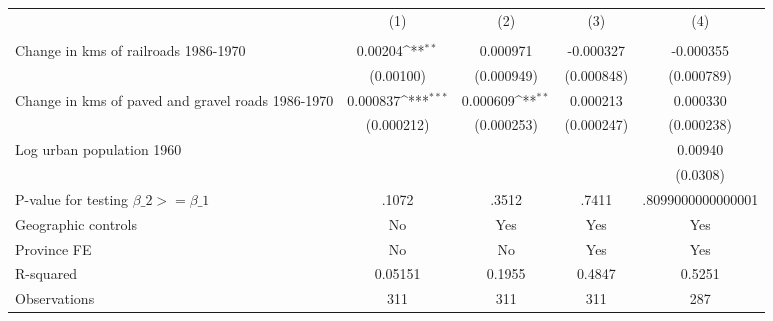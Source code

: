 {
\def\sym#1{\ifmmode^{#1}\else\(^{#1}\)\fi}
\begin{tabular}{l*{4}{c}}
\hline\hline
                &\multicolumn{1}{c}{(1)}&\multicolumn{1}{c}{(2)}&\multicolumn{1}{c}{(3)}&\multicolumn{1}{c}{(4)}\\
                &\multicolumn{1}{c}{}&\multicolumn{1}{c}{}&\multicolumn{1}{c}{}&\multicolumn{1}{c}{}\\
\hline
Change in kms of railroads 1986-1970&  0.00204\sym{**} & 0.000971         &-0.000327         &-0.000355         \\
                &(0.00100)         &(0.000949)         &(0.000848)         &(0.000789)         \\
[1em]
Change in kms of paved and gravel roads 1986-1970& 0.000837\sym{***}& 0.000609\sym{**} & 0.000213         & 0.000330         \\
                &(0.000212)         &(0.000253)         &(0.000247)         &(0.000238)         \\
[1em]
Log urban population 1960&                  &                  &                  &  0.00940         \\
                &                  &                  &                  & (0.0308)         \\
\hline
P-value for testing $\beta\_{2} >= \beta\_{1}$&    .1072         &    .3512         &    .7411         &.8099000000000001         \\
Geographic controls&       No         &      Yes         &      Yes         &      Yes         \\
Province FE     &       No         &       No         &      Yes         &      Yes         \\
R-squared       &  0.05151         &   0.1955         &   0.4847         &   0.5251         \\
Observations    &      311         &      311         &      311         &      287         \\
\hline\hline
\end{tabular}
}
